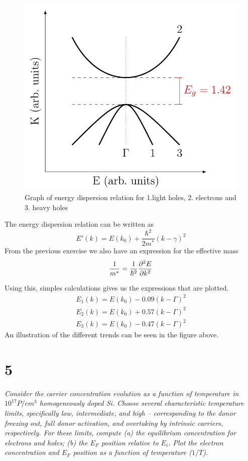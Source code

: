 \documentclass{article}
\begin{document}
\begin{figure}
	\includegraphics[width = 0.7\linewidth]{bandgap.png}
	\centering
	\caption{Graph of energy dispersion relation for 1.light holes, 2. electrons and 3. heavy holes}
\end{figure}

The energy dispersion relation can be written as
\begin{equation*}
	E'(k) = E(k_0) + \frac{\hbar^2}{2m^*}(k-\gamma)^2
\end{equation*}
From the previous exercise we also have an expression for the effective mass
\begin{equation*}
	\frac{1}{m^*} = \frac{1}{\hbar^2}\pdv[2]{E}{k}
\end{equation*}

Using this, simples calculations gives us the expressions that are plotted.
\begin{align*}
	E_1(k) = E(k_0)-0.09(k-\Gamma)^2\\
	E_2(k) = E(k_0)+0.57(k-\Gamma)^2\\
	E_3(k) = E(k_0)-0.47(k-\Gamma)^2
\end{align*}
An illustration of the different trends can be seen in the figure above.

\newpage
\section*{5}

\emph{Consider the carrier concentration evolution as a function of temperature in $10^17P/cm^3$ homogeneously doped Si. Choose several characteristic temperature limits, specifically low, intermediate, and high – corresponding to the donor freezing out, full donor activation, and overtaking by intrinsic carriers, respectively. For these limits, compute (a) the equilibrium concentration for electrons and holes;
(b) the $E_F$ position relative to $E_i$.
Plot the electron concentration and $E_F$ position as a function of temperature ($1/T$).}\\
\end{document}
